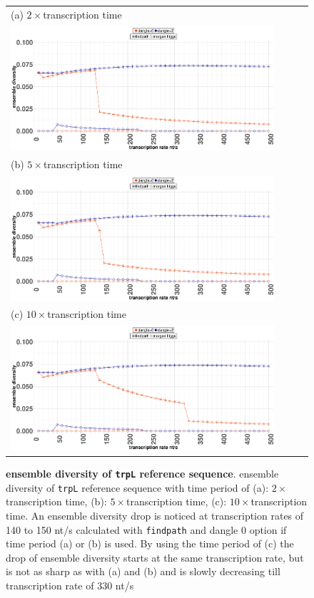 \documentclass[ twoside,openright,titlepage,numbers=noenddot,headinclude,%
                footinclude=false, cleardoublepage=empty,abstractoff, %
                BCOR=5mm,paper=a4,fontsize=11pt,%
                ngerman,american,%
                ]{scrreprt}
\begin{document}
\begin{figure}[ht]
\begin{tabular}{l}
(a) $2 \times$transcription time \\
\includegraphics[width=0.9\textwidth]{./pictures/ensembleDiversity/trpL2.pdf}\\
\hline
(b) $5 \times$transcription time \\
\includegraphics[width=0.9\textwidth]{./pictures/ensembleDiversity/trpL5.pdf}\\
\hline
(c) $10 \times$transcription time \\
\includegraphics[width=0.9\textwidth]{./pictures/ensembleDiversity/trpL10.pdf}\\
\end{tabular}
\caption{{\bf ensemble diversity of \texttt{trpL} reference sequence}.
ensemble diversity of \texttt{trpL} reference sequence with time period of (a): $2\times$transcription time, (b): $5\times$transcription time, (c): $10\times$transcription time. An ensemble diversity drop is noticed at transcription rates of 140 to 150 nt/s calculated with \texttt{findpath} and dangle $0$ option if time period (a) or (b) is used.
By using the time period of (c) the drop of ensemble diversity starts at the same transcription rate, but is not as sharp as with (a) and (b) and is slowly decreasing till transcription rate of 330 nt/s }
\label{fig:ensemble_diversity_AE005174.2}
\end{figure}
\end{document}
